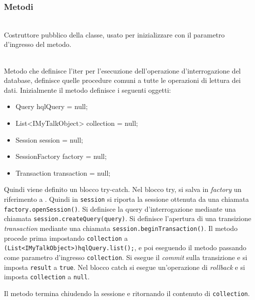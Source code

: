 \subsubsection*{Metodi}

\begin{description}
	\item{}\\
	Costruttore pubblico della classe, usato per inizializzare  con il parametro d'ingresso del metodo.
	
	\item{}\\
	Metodo che definisce l'iter per l'esecuzione dell'operazione d'interrogazione del database,  definisce quelle procedure comuni a tutte le operazioni di lettura dei dati. Inizialmente il metodo definisce i seguenti oggetti:
	\begin{itemize}
		\item Query hqlQuery = null;
		\item List<IMyTalkObject> collection = null;
		\item Session session = null;
		\item SessionFactory factory = null;
		\item Transaction transaction = null;
	\end{itemize}
	
Quindi viene definito un blocco try-catch. Nel blocco try, si salva in \textit{factory} un riferimento a . Quindi in \texttt{session} si riporta la sessione ottenuta da una chiamata \verb|factory.openSession()|. Si definisce la query d'interrogazione mediante una chiamata \verb|session.createQuery(query)|. Si definisce l'apertura di una transizione \textit{transaction} mediante una chiamata \verb|session.beginTransaction()|. Il metodo procede prima impostando \texttt{collection} a \verb|(List<IMyTalkObject>)hqlQuery.list();|, e poi eseguendo il metodo  passando come parametro d'ingresso \texttt{collection}. Si esegue il \textit{commit} sulla transizione e si imposta \texttt{result} a \texttt{true}. Nel blocco catch si esegue un'operazione di \textit{rollback} e si imposta \texttt{collection} a \texttt{null}.

Il metodo termina chiudendo la sessione e ritornando il contenuto di \texttt{collection}.


\end{description}
